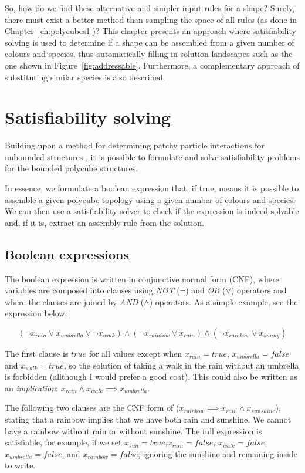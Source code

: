 So, how do we find these alternative and simpler input rules for a shape? Surely, there must exist a better method than sampling the space of all rules (as done in Chapter~\ref{ch:polycubes1})? This chapter presents an approach where satisfiability solving is used to determine if a shape can be assembled from a given number of colours and species, thus automatically filling in solution landscapes such as the one shown in Figure~\ref{fig:addressable}. Furthermore, a complementary approach of substituting similar species is also described.


\section{Satisfiability solving}

Building upon a method for determining patchy particle interactions for unbounded structures \cite{romano2020designing}, it is possible to formulate and solve satisfiability problems for the bounded polycube structures.

In essence, we formulate a boolean expression that, if true, means it is possible to assemble a given polycube topology using a given number of colours and species. We can then use a satisfiability solver to check if the expression is indeed solvable and, if it is, extract an assembly rule from the solution.

\subsection{Boolean expressions}

The boolean expression is written in conjunctive normal form (CNF), where variables are composed into clauses using \emph{NOT} (\(\lnot\)) and \emph{OR} (\(\lor\)) operators and where the clauses are joined by \emph{AND} (\(\land\)) operators. As a simple example, see the expression below:

\[
    (\lnot x_{rain} \lor x_{umbrella} \lor  \lnot x_{walk}) \land
    (\lnot x_{rainbow} \lor x_{rain}) \land
    (\lnot x_{rainbow} \lor x_{sunny})
\]

The first clause is \({true}\) for all values except when \(x_{rain}={true}\), \(x_{umbrella}={false}\) and \(x_{walk}=true\), so the solution of taking a walk in the rain without an umbrella is forbidden (allthough I would prefer a good coat). This could also be written as an \emph{implication}: \(x_{rain} \land x_{walk} \implies x_{umbrella}\).

The following two clauses are the CNF form of (\(x_{rainbow} \implies  x_{rain} \land x_{sunshine}\)), stating that a rainbow implies that we have both rain and sunshine. We cannot have a rainbow without rain or without sunshine. The full expression is satisfiable, for example, if we set \(x_{sun}=true\),\(x_{rain}=false\), \(x_{walk}=false\), \(x_{umbrella}=false\), and \(x_{rainbow}=false\); ignoring the sunshine and remaining inside to write.

